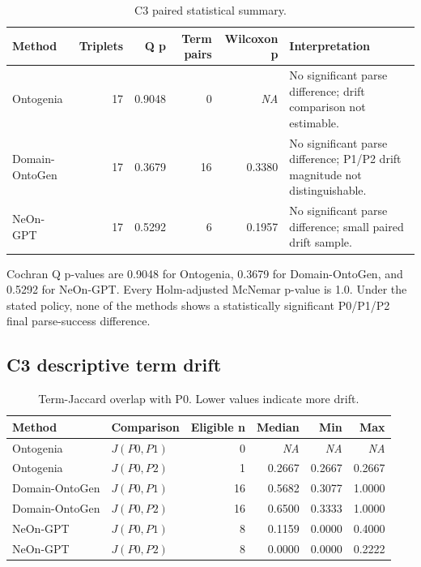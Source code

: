 \documentclass[11pt,a4paper]{article}
\newcommand{\NA}{\textit{NA}}
\begin{document}
\begin{table}[H]
\centering
\caption{C3 paired statistical summary.}
\label{tab:c3tests}
\small
\begin{tabularx}{\textwidth}{lrrrrX}
\toprule
Method & Triplets & Q p & Term pairs & Wilcoxon p & Interpretation \\
\midrule
Ontogenia & 17 & 0.9048 & 0 & \NA & No significant parse difference; drift comparison not estimable. \\
Domain-OntoGen & 17 & 0.3679 & 16 & 0.3380 & No significant parse difference; P1/P2 drift magnitude not distinguishable. \\
NeOn-GPT & 17 & 0.5292 & 6 & 0.1957 & No significant parse difference; small paired drift sample. \\
\bottomrule
\end{tabularx}
\end{table}

Cochran Q p-values are 0.9048 for Ontogenia, 0.3679 for Domain-OntoGen, and
0.5292 for NeOn-GPT. Every Holm-adjusted McNemar p-value is 1.0. Under the stated
policy, none of the methods shows a statistically significant P0/P1/P2 final
parse-success difference.

\subsection{C3 descriptive term drift}

\begin{table}[H]
\centering
\caption{Term-Jaccard overlap with P0. Lower values indicate more drift.}
\label{tab:jaccard}
\small
\begin{tabular}{llrrrr}
\toprule
Method & Comparison & Eligible n & Median & Min & Max \\
\midrule
Ontogenia      & $J(P0,P1)$ & 0  & \NA    & \NA    & \NA \\
Ontogenia      & $J(P0,P2)$ & 1  & 0.2667 & 0.2667 & 0.2667 \\
Domain-OntoGen & $J(P0,P1)$ & 16 & 0.5682 & 0.3077 & 1.0000 \\
Domain-OntoGen & $J(P0,P2)$ & 16 & 0.6500 & 0.3333 & 1.0000 \\
NeOn-GPT       & $J(P0,P1)$ & 8  & 0.1159 & 0.0000 & 0.4000 \\
NeOn-GPT       & $J(P0,P2)$ & 8  & 0.0000 & 0.0000 & 0.2222 \\
\bottomrule
\end{tabular}
\end{table}
\end{document}

